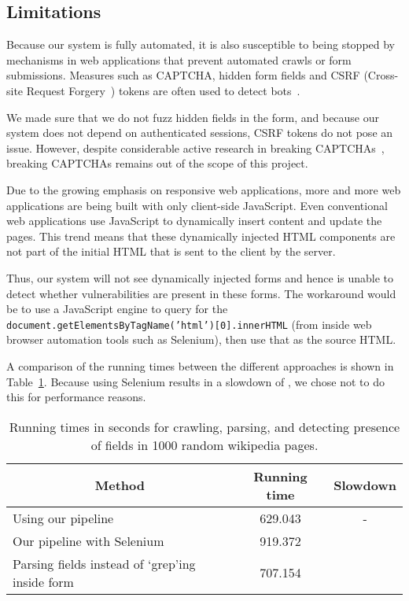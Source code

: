 \subsection[Limitations]{Limitations}
\label{limitations}
		Because our system is fully automated, it is also susceptible to being stopped by mechanisms in web applications that prevent automated crawls or form submissions. Measures such as CAPTCHA, hidden form fields and CSRF (Cross-site Request Forgery~\cite{csrf}) tokens are often used to detect bots~\cite{captchas3, captchas2}.

		We made sure that we do not fuzz hidden fields in the form, and because our system does not depend on authenticated sessions, CSRF tokens do not pose an issue. However, despite considerable active research in breaking CAPTCHAs~\cite{captchas2, captchas}, breaking CAPTCHAs remains out of the scope of this project. 
		
	   Due to the growing emphasis on responsive web applications, more and more web applications are being built with only client-side JavaScript. Even conventional web applications use JavaScript to dynamically insert content and update the pages. This trend means that these dynamically injected HTML components are not part of the initial HTML that is sent to the client by the server.

		Thus, our system will not see dynamically injected forms and hence is unable to detect whether \ehi vulnerabilities are present in these forms. The workaround would be to use a JavaScript engine to query for the \texttt{document.getElementsByTagName('html')[0].innerHTML} (from inside web browser automation tools such as Selenium), then use that as the source HTML. 
		
		A comparison of the running times between the different approaches is shown in Table~\ref{tab:perf}. Because using Selenium results in a slowdown of \slowSelenium, we chose not to do this for performance reasons. 
		
		\begin{table}
			\centering
			\normalsize
			\begin{tabular}{|p{4cm}|c|c|}
				\hline
				\multicolumn{1}{|c}{\textbf{Method}} &
				\multicolumn{1}{|c|}{\textbf{Running time}} &
				\multicolumn{1}{|c|}{\textbf{Slowdown}}
				\\
				\hline
				\centering Using our pipeline & 629.043 & - \\
				\hline
				\centering Our pipeline with Selenium & 919.372 & \slowSelenium \\
				\hline				
				\centering Parsing \email fields instead of `grep'ing inside form & 707.154 & \slowParse \\								
				\hline
			\end{tabular}
			\caption[\titlecap{}]{Running times in seconds for crawling, parsing, and detecting presence of \email fields in 1000 random wikipedia pages.}
			\label{tab:perf}
		\end{table}

